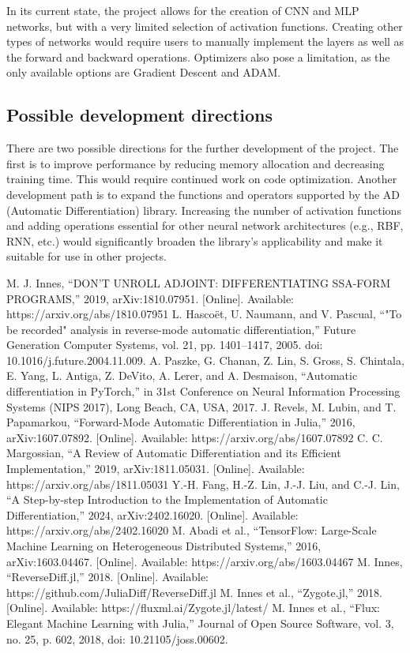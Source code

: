 \documentclass[conference]{IEEEtran}
\begin{document}
In its current state, the project allows for the creation of CNN and MLP networks, but with a very limited selection of activation functions. Creating other types of networks would require users to manually implement the layers as well as the forward and backward operations. Optimizers also pose a limitation, as the only available options are Gradient Descent and ADAM.

\subsection{Possible development directions}
There are two possible directions for the further development of the project. The first is to improve performance by reducing memory allocation and decreasing training time. This would require continued work on code optimization.
Another development path is to expand the functions and operators supported by the AD (Automatic Differentiation) library. Increasing the number of activation functions and adding operations essential for other neural network architectures (e.g., RBF, RNN, etc.) would significantly broaden the library's applicability and make it suitable for use in other projects.

\begin{thebibliography}{00}
 M. J. Innes, ``DON'T UNROLL ADJOINT: DIFFERENTIATING SSA-FORM PROGRAMS,'' 2019, arXiv:1810.07951. [Online]. Available: https://arxiv.org/abs/1810.07951
 L. Hascoët, U. Naumann, and V. Pascual, ``"To be recorded" analysis in reverse-mode automatic differentiation,'' Future Generation Computer Systems, vol. 21, pp. 1401--1417, 2005. doi: 10.1016/j.future.2004.11.009.
 A. Paszke, G. Chanan, Z. Lin, S. Gross, S. Chintala, E. Yang, L. Antiga, Z. DeVito, A. Lerer, and A. Desmaison, ``Automatic differentiation in PyTorch,'' in 31st Conference on Neural Information Processing Systems (NIPS 2017), Long Beach, CA, USA, 2017.
 J. Revels, M. Lubin, and T. Papamarkou, ``Forward-Mode Automatic Differentiation in Julia,'' 2016, arXiv:1607.07892. [Online]. Available: https://arxiv.org/abs/1607.07892
 C. C. Margossian, ``A Review of Automatic Differentiation and its Efficient Implementation,'' 2019, arXiv:1811.05031. [Online]. Available: https://arxiv.org/abs/1811.05031
 Y.-H. Fang, H.-Z. Lin, J.-J. Liu, and C.-J. Lin, ``A Step-by-step Introduction to the Implementation of Automatic Differentiation,'' 2024, arXiv:2402.16020. [Online]. Available: https://arxiv.org/abs/2402.16020
 M. Abadi et al., ``TensorFlow: Large-Scale Machine Learning on Heterogeneous Distributed Systems,'' 2016, arXiv:1603.04467. [Online]. Available: https://arxiv.org/abs/1603.04467
 M. Innes, ``ReverseDiff.jl,'' 2018. [Online]. Available: https://github.com/JuliaDiff/ReverseDiff.jl
 M. Innes et al., ``Zygote.jl,'' 2018. [Online]. Available: https://fluxml.ai/Zygote.jl/latest/
 M. Innes et al., ``Flux: Elegant Machine Learning with Julia,'' Journal of Open Source Software, vol. 3, no. 25, p. 602, 2018, doi: 10.21105/joss.00602.
\end{thebibliography}
\end{document}
